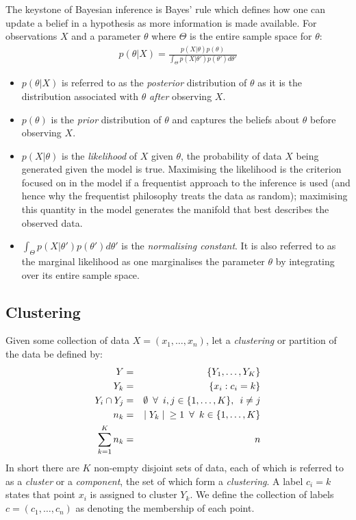 \documentclass[12pt]{article} %
\begin{document}
	The keystone of Bayesian inference is Bayes' rule which defines how one can update a belief in a hypothesis as more information is made available. For observations $X$ and a parameter $\theta$ where $\Theta$ is the entire sample space for $\theta$:
	\begin{align} \label{Bayes_theorem}
	p(\theta | X) = \frac{p(X | \theta) p(\theta)}{\int_\Theta p(X | \theta ') p(\theta ') d \theta '}
	\end{align}
	\begin{itemize}
		\item $p(\theta | X)$ is referred to as the \emph{posterior} distribution of $\theta$ as it is the distribution associated with $\theta$ \emph{after} observing $X$.
		\item $p(\theta)$ is the \emph{prior} distribution of $\theta$ and captures the beliefs about $\theta$ before observing $X$.
		\item $p(X | \theta)$ is the \emph{likelihood} of $X$ given $\theta$, the probability of data $X$ being generated given the model is true. Maximising the likelihood is the criterion focused on in the model if a frequentist approach to the inference is used (and hence why the frequentist philosophy treats the data as random); maximising this quantity in the model generates the manifold that best describes the observed data. 
		\item $\int_\Theta p(X | \theta ') p(\theta ') d \theta '$ is the \emph{normalising constant}. It is also referred to as the marginal likelihood as one marginalises the parameter $\theta$ by integrating over its entire sample space.
	\end{itemize}
	
	\subsection{Clustering} \label{sec:clustering}
	Given some collection of data $X=\left(x_1,\ldots,x_n\right)$, let a \emph{clustering} or partition of the data be defined by:
	\begin{eqnarray}
	Y &=& \left\{Y_1,\ldots,Y_K\right\} \\
	Y_k &=& \left\{x_i : c_i = k \right\}  \\
	Y_i \cap Y_j &=& \emptyset \enskip \forall \enskip i,j \in \{1,\ldots,K\}, \enskip i \neq j \\
	n_k & = & \mid Y_k \mid \enskip \geq 1 \enskip \forall \enskip k \in \{1,\ldots,K\} \\
	\sum_{k=1}^Kn_k &=& n
	\end{eqnarray}
	In short there are $K$ non-empty disjoint sets of data, each of which is referred to as a \emph{cluster} or a \emph{component}, the set of which form a \emph{clustering}. A label $c_i=k$ states that point $x_i$ is assigned to cluster $Y_k$. We define the collection of labels $c=(c_1,\ldots,c_n)$ as denoting the membership of each point.
	
\end{document}
